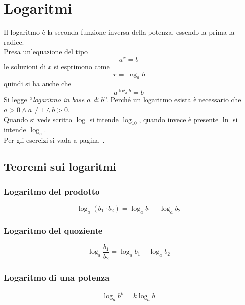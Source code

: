 
\section{Logaritmi}\label{sec:logaritmi}
Il logaritmo è la seconda funzione inversa della potenza, essendo la prima la radice.\\
Presa un'equazione del tipo
\begin{equation*}
  a^x=b
\end{equation*}
le soluzioni di $x$ si esprimono come
\begin{equation*}
  x = \log_a b
\end{equation*}
quindi si ha anche che 
\begin{equation*}
  a^{\log_a b} = b
\end{equation*}
Si legge ``\textit{logaritmo in base $a$ di $b$}''. Perché un logaritmo esista è necessario che
$a>0\land a\neq1\land b > 0$.\\
Quando si vede scritto $\log$ si intende $\log_{10}$, quando invece è presente $\ln$ si intende
$\log_e$.\\
Per gli esercizi si vada a pagina~\pageref{ex:logaritmi}.

\subsection{Teoremi sui logaritmi}
\subsubsection{Logaritmo del prodotto}
\begin{equation*}
  \log_a (b_1\cdot b_2) = \log_a b_1 + \log_a b_2
\end{equation*}

\subsubsection{Logaritmo del quoziente}
\begin{equation*}
  \log_a\frac{b_1}{b_2} = \log_a b_1 - \log_a b_2
\end{equation*}

\subsubsection{Logaritmo di una potenza}
\begin{equation*}
  \log_a b^k = k\log_a b
\end{equation*}

